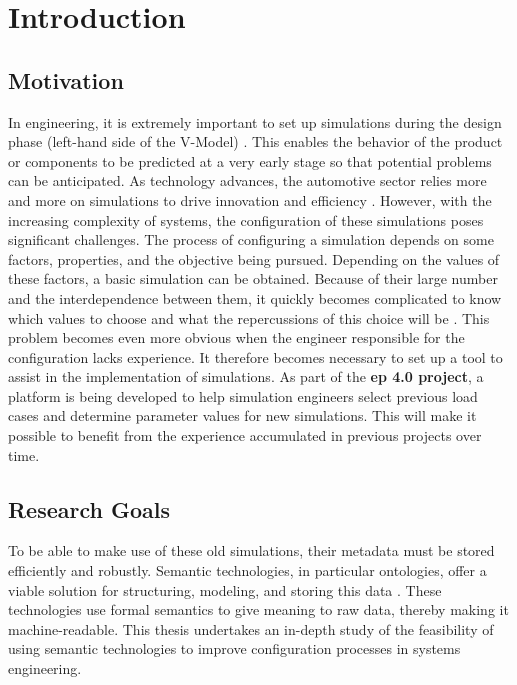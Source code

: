 \section{Introduction\label{sec:introduction}}
\subsection{Motivation}
In engineering, it is extremely important to set up simulations during the design phase (left-hand side of the V-Model) \cite{hammami2015thefose}. This enables the behavior of the product or components to be predicted at a very early stage so that potential problems can be anticipated.  As technology advances, the automotive sector relies more and more on simulations to drive innovation and efficiency \cite{hammami2015thefose}. However, with the increasing complexity of systems, the configuration of these simulations poses significant challenges. The process of configuring a simulation depends on some factors, properties, and the objective being pursued. Depending on the values of these factors, a basic simulation can be obtained. Because of their large number and the interdependence between them, it quickly becomes complicated to know which values to choose and what the repercussions of this choice will be \cite{hammami2015thefose, horsch2021osmo, spelten2023simulation}. This problem becomes even more obvious when the engineer responsible for the configuration lacks experience. It therefore becomes necessary to set up a tool to assist in the implementation of simulations. As part of the \textbf{\acrfull{ep} 4.0 project}, a platform is being developed to help simulation engineers select previous load cases and determine parameter values for new simulations. This will make it possible to benefit from the experience accumulated in previous projects over time.


\subsection{Research Goals}
To be able to make use of these old simulations, their metadata must be stored efficiently and robustly. Semantic technologies, in particular ontologies, offer a viable solution for structuring, modeling, and storing this data \cite{horsch2021osmo, spelten2023simulation}. These technologies use formal semantics to give meaning to raw data, thereby making it machine-readable. This thesis undertakes an in-depth study of the feasibility of using semantic technologies to improve configuration processes in systems engineering.\\

